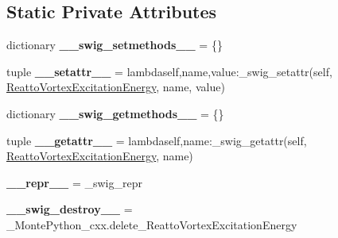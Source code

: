 \subsection*{Static Private Attributes}
\begin{DoxyCompactItemize}
\item 
\hypertarget{classMontePython__cxx_1_1ReattoVortexExcitationEnergy_adbe17a385641494598ce3f56756ca2e3}{}dictionary {\bfseries \+\_\+\+\_\+swig\+\_\+setmethods\+\_\+\+\_\+} = \{\}\label{classMontePython__cxx_1_1ReattoVortexExcitationEnergy_adbe17a385641494598ce3f56756ca2e3}

\item 
\hypertarget{classMontePython__cxx_1_1ReattoVortexExcitationEnergy_a12c8aedba22e8a231b577197abe79b2b}{}tuple {\bfseries \+\_\+\+\_\+setattr\+\_\+\+\_\+} = lambdaself,name,value\+:\+\_\+swig\+\_\+setattr(self, \hyperlink{classMontePython__cxx_1_1ReattoVortexExcitationEnergy}{Reatto\+Vortex\+Excitation\+Energy}, name, value)\label{classMontePython__cxx_1_1ReattoVortexExcitationEnergy_a12c8aedba22e8a231b577197abe79b2b}

\item 
\hypertarget{classMontePython__cxx_1_1ReattoVortexExcitationEnergy_a4e8eef9f15d6661f349c70bfa661b6bd}{}dictionary {\bfseries \+\_\+\+\_\+swig\+\_\+getmethods\+\_\+\+\_\+} = \{\}\label{classMontePython__cxx_1_1ReattoVortexExcitationEnergy_a4e8eef9f15d6661f349c70bfa661b6bd}

\item 
\hypertarget{classMontePython__cxx_1_1ReattoVortexExcitationEnergy_a6ce56ba3f4bcd1002c1d05bc19ec879d}{}tuple {\bfseries \+\_\+\+\_\+getattr\+\_\+\+\_\+} = lambdaself,name\+:\+\_\+swig\+\_\+getattr(self, \hyperlink{classMontePython__cxx_1_1ReattoVortexExcitationEnergy}{Reatto\+Vortex\+Excitation\+Energy}, name)\label{classMontePython__cxx_1_1ReattoVortexExcitationEnergy_a6ce56ba3f4bcd1002c1d05bc19ec879d}

\item 
\hypertarget{classMontePython__cxx_1_1ReattoVortexExcitationEnergy_a70a0dc0bb4d33e7a3e17046097ce0661}{}{\bfseries \+\_\+\+\_\+repr\+\_\+\+\_\+} = \+\_\+swig\+\_\+repr\label{classMontePython__cxx_1_1ReattoVortexExcitationEnergy_a70a0dc0bb4d33e7a3e17046097ce0661}

\item 
\hypertarget{classMontePython__cxx_1_1ReattoVortexExcitationEnergy_abd4328f95ba27ec3ab02b6a853c0c4fb}{}{\bfseries \+\_\+\+\_\+swig\+\_\+destroy\+\_\+\+\_\+} = \+\_\+\+Monte\+Python\+\_\+cxx.\+delete\+\_\+\+Reatto\+Vortex\+Excitation\+Energy\label{classMontePython__cxx_1_1ReattoVortexExcitationEnergy_abd4328f95ba27ec3ab02b6a853c0c4fb}

\end{DoxyCompactItemize}


